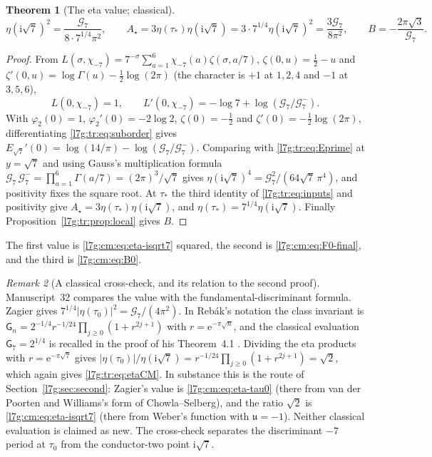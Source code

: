 \documentclass[11pt,letterpaper]{article}
\newtheorem{theorem}{Theorem}[section]
\theoremstyle{remark}\newtheorem{remark}[theorem]{Remark}
\newcommand{\G}{\mathcal G_7}\newcommand{\Ast}{A_\star}
\newcommand{\ii}{\mathrm i}\newcommand{\ee}{\mathrm e}
\newcommand{\Gm}{\mathcal G_7^{-}}\newcommand{\qq}{\mathfrak q}
\newcounter{l7gtrsavedeq}
\begin{document}
\begin{theorem}[The eta value; classical]\label{l7g:tr:thm:eta}
\begin{equation}\label{l7g:tr:eq:etaCM}
 \eta(\ii\sqrt7)^2=\frac{\G}{8\cdot7^{1/4}\pi^2},\qquad
 \Ast=3\eta(\tau_*)\eta(\ii\sqrt7)=3\cdot7^{1/4}\eta(\ii\sqrt7)^2
 =\frac{3\G}{8\pi^2},\qquad B=-\frac{2\pi\sqrt3}{\G}.
\end{equation}
\end{theorem}
\begin{proof}
From $L(\sigma,\chi_{-7})=7^{-\sigma}\sum_{a=1}^6\chi_{-7}(a)\zeta(\sigma,a/7)$,
$\zeta(0,u)=\frac12-u$ and $\zeta'(0,u)=\log\Gamma(u)-\frac12\log(2\pi)$
(the character is $+1$ at $1,2,4$ and $-1$ at $3,5,6$),
\[
 L(0,\chi_{-7})=1,\qquad L'(0,\chi_{-7})=-\log7+\log(\G/\Gm).
\]
With $\varphi_2(0)=1$, $\varphi_2'(0)=-2\log2$, $\zeta(0)=-\frac12$ and
$\zeta'(0)=-\frac12\log(2\pi)$, differentiating \eqref{l7g:tr:eq:suborder}
gives $E_{\sqrt7}'(0)=\log(14/\pi)-\log(\G/\Gm)$. Comparing with
\eqref{l7g:tr:eq:Eprime} at $y=\sqrt7$ and using Gauss's multiplication
formula $\G\,\Gm=\prod_{a=1}^6\Gamma(a/7)=(2\pi)^3/\sqrt7$ gives
$\eta(\ii\sqrt7)^4=\G^2/(64\sqrt7\,\pi^4)$, and positivity fixes the square
root. At $\tau_*$ the third identity of \eqref{l7g:tr:eq:inputs} and
positivity give $\Ast=3\eta(\tau_*)\eta(\ii\sqrt7)$, and
$\eta(\tau_*)=7^{1/4}\eta(\ii\sqrt7)$. Finally
Proposition~\ref{l7g:tr:prop:local} gives $B$.
\end{proof}
The first value is \eqref{l7g:cm:eq:eta-isqrt7} squared, the second is
\eqref{l7g:cm:eq:F0-final}, and the third is \eqref{l7g:cm:eq:B0}.

\begin{remark}[A classical cross-check, and its relation to the second proof]\label{l7g:tr:rem:classical}
Manuscript~32 compares the value with the fundamental-discriminant
formula. Zagier gives \cite[p.~95]{l7g:tr:zagier}
$7^{1/4}|\eta(\tau_0)|^2=\G/(4\pi^2)$. In Reb\'ak's notation the class
invariant is $\mathsf G_n=2^{-1/4}r^{-1/24}\prod_{j\ge0}(1+r^{2j+1})$ with
$r=\ee^{-\pi\sqrt n}$, and the classical evaluation $\mathsf G_7=2^{1/4}$ is
recalled in the proof of his Theorem~4.1 \cite{l7g:tr:rebak}. Dividing the
eta products with $r=\ee^{-\pi\sqrt7}$ gives
$|\eta(\tau_0)|/\eta(\ii\sqrt7)=r^{-1/24}\prod_{j\ge0}(1+r^{2j+1})=\sqrt2$,
which again gives \eqref{l7g:tr:eq:etaCM}. In substance this is the route
of Section~\ref{l7g:sec:second}: Zagier's value is \eqref{l7g:cm:eq:eta-tau0}
(there from van der Poorten and Williams's form of Chowla--Selberg), and the
ratio $\sqrt2$ is \eqref{l7g:cm:eq:eta-isqrt7} (there from Weber's function
with $\mathfrak u=-1$). Neither classical evaluation is claimed as new. The
cross-check separates the discriminant $-7$ period at $\tau_0$ from the
conductor-two point $\ii\sqrt7$.
\end{remark}
\end{document}
